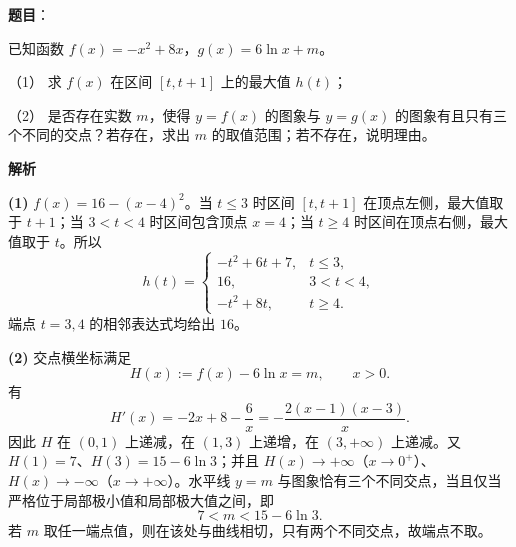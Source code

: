 \begin{answer}

\textbf{题目}：

已知函数 $f(x)=-x^2+8x$，$g(x)=6\ln x+m$。

（1） 求 $f(x)$ 在区间 $[t,t+1]$ 上的最大值 $h(t)$；

（2） 是否存在实数 $m$，使得 $y=f(x)$ 的图象与 $y=g(x)$ 的图象有且只有三个不同的交点？若存在，求出 $m$ 的取值范围；若不存在，说明理由。

\textbf{解析}

\textbf{(1)} $f(x)=16-(x-4)^2$。当 $t\le3$ 时区间 $[t,t+1]$ 在顶点左侧，最大值取于 $t+1$；当 $3<t<4$ 时区间包含顶点 $x=4$；当 $t\ge4$ 时区间在顶点右侧，最大值取于 $t$。所以
\nopagebreak[4]
\[
h(t)=\begin{cases}
-t^2+6t+7,&t\le3,\\
16,&3<t<4,\\
-t^2+8t,&t\ge4.
\end{cases}
\]
端点 $t=3,4$ 的相邻表达式均给出 $16$。

\textbf{(2)} 交点横坐标满足
\nopagebreak[4]
\[
H(x):=f(x)-6\ln x=m,\qquad x>0.
\]
有
\nopagebreak[4]
\[
H'(x)=-2x+8-\frac6x=-\frac{2(x-1)(x-3)}x.
\]
因此 $H$ 在 $(0,1)$ 上递减，在 $(1,3)$ 上递增，在 $(3,+\infty)$ 上递减。又 $H(1)=7$、$H(3)=15-6\ln3$；并且 $H(x)\to+\infty$（$x\to0^+$）、$H(x)\to-\infty$（$x\to+\infty$）。水平线 $y=m$ 与图象恰有三个不同交点，当且仅当严格位于局部极小值和局部极大值之间，即
\nopagebreak[4]
\[
7<m<15-6\ln3.
\]
若 $m$ 取任一端点值，则在该处与曲线相切，只有两个不同交点，故端点不取。



\end{answer}
